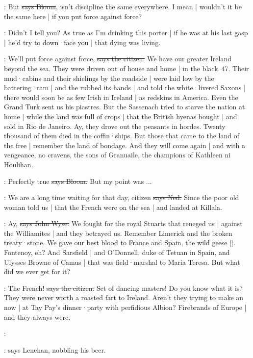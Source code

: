 \Bloom:
But
\sout{says Bloom},
isn't discipline the same everywhere.
I mean |
wouldn't it be the same here |
if you put force against force?

\Nq:
Didn't I tell you?
As true as I'm drinking this porter |
if he was at his last gasp |
he'd try to down·face you |
that dying was living.

\citizen:
We'll put force against force,
\sout{says the citizen.}
We have our greater Ireland beyond the sea.
They were driven out of house and home |
in the black~47.
Their mud·cabins and their shielings by the roadside |
were laid low by the battering·ram |
and the  rubbed its hands |
and told the white·livered Saxons |
there would soon be as few Irish in Ireland |
as redskins in America.
Even the Grand Turk sent us his piastres.
But the Sassenach tried to starve the nation at home
 |
while the land was full of crops |
that the British hyenas bought |
and sold in Rio de Janeiro.
Ay,
they drove out the peasants in hordes.
Twenty thousand of them died in the coffin·ships.
But those that came to the land of the free |
remember the land of bondage.
And they will come again |
and with a vengeance,
no cravens,
the sons of Granuaile,
the champions of Kathleen ni Houlihan.

\Bloom:
Perfectly true
\sout{says Bloom.}
But my point was ...

\lambert:
We are a long time waiting for that day,
citizen
\sout{says Ned.}
Since the poor old woman told us |
that the French were on the sea |
and landed at Killala.

\johnwyse:
Ay,
\sout{says John Wyse.}
We fought for the royal Stuarts that reneged us |
against the Williamites |
and they betrayed us.
Remember Limerick and the broken treaty·stone.
We gave our best blood to France and Spain,
the wild geese
[].
Fontenoy,
eh?
And Sarsfield |
and O'Donnell,
duke of Tetuan in Spain,
and Ulysses Browne of Camus |
that was field·marshal to Maria Teresa.
But what did we ever get for it?

\citizen:
The French!
\sout{says the citizen.}
Set of dancing masters!
Do you know what it is?
They were never worth a roasted fart to Ireland.
Aren't they trying to make an  now |
at Tay Pay's dinner·party with perfidious Albion?
Firebrands of Europe |
and they always were.

\lenehan:

\Nq:
says Lenehan,
nobbling his beer.

